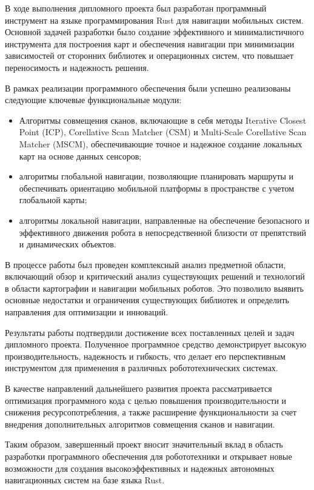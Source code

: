 \label{sec:ending}

В ходе выполнения дипломного проекта был разработан программный инструмент на языке программирования Rust для навигации мобильных систем. Основной задачей разработки было создание эффективного и минималистичного инструмента для построения карт и обеспечения навигации при минимизации зависимостей от сторонних библиотек и операционных систем, что повышает переносимость и надежность решения.

В рамках реализации программного обеспечения были успешно реализованы следующие ключевые функциональные модули:

\begin{itemize}
	\item Алгоритмы совмещения сканов, включающие в себя методы Iterative Closest Point (ICP), Corellative Scan Matcher (CSM) и Multi-Scale Corellative Scan Matcher (MSCM), обеспечивающие точное и надежное создание локальных карт на основе данных сенсоров;
	\item алгоритмы глобальной навигации, позволяющие планировать маршруты и обеспечивать ориентацию мобильной платформы в пространстве с учетом глобальной карты;
	\item алгоритмы локальной навигации, направленные на обеспечение безопасного и эффективного движения робота в непосредственной близости от препятствий и динамических объектов.
\end{itemize}


В процессе работы был проведен комплексный анализ предметной области, включающий обзор и критический анализ существующих решений и технологий в области картографии и навигации мобильных роботов. Это позволило выявить основные недостатки и ограничения существующих библиотек и определить направления для оптимизации и инноваций.

Результаты работы подтвердили достижение всех поставленных целей и задач дипломного проекта. Полученное программное средство демонстрирует высокую производительность, надежность и гибкость, что делает его перспективным инструментом для применения в различных робототехнических системах.

В качестве направлений дальнейшего развития проекта рассматривается оптимизация программного кода с целью повышения производительности и снижения ресурсопотребления, а также расширение функциональности за счет внедрения дополнительных алгоритмов совмещения сканов и навигации.

Таким образом, завершенный проект вносит значительный вклад в область разработки программного обеспечения для робототехники и открывает новые возможности для создания высокоэффективных и надежных автономных навигационных систем на базе языка Rust.
